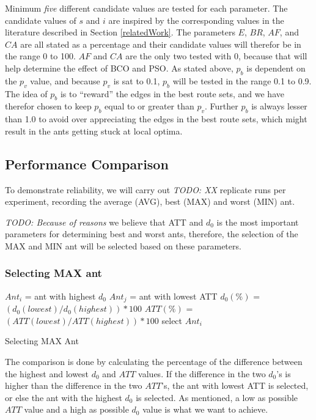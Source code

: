 Minimum \textit{five} different candidate values are tested for each parameter. The candidate values of $s$ and $i$ are inspired by the corresponding values in the literature described in Section \vref{relatedWork}. The parameters $E$, $BR$, $AF$, and $CA$ are all stated as a percentage and their candidate values will therefor be in the range 0 to 100. $AF$ and $CA$ are the only two tested with 0, because that will help determine the effect of BCO and PSO. As stated above, $p_b$ is dependent on the $p_v$ value, and because $p_v$ is sat to 0.1, $p_b$ will be tested in the range 0.1 to 0.9. The idea of $p_b$ is to ``reward'' the edges in the best route sets, and we have therefor chosen to keep $p_b$ equal to or greater than $p_v$. Further $p_b$ is always lesser than 1.0 to avoid over appreciating the edges in the best route sets, which might result in the ants getting stuck at local optima. 

\subsection{Performance Comparison}

To demonstrate reliability, we will carry out \emph{\color{blue} TODO: XX } replicate runs per experiment, recording the average (AVG), best (MAX) and worst (MIN) ant.  

\emph{\color{blue} TODO: Because of reasons }we believe that ATT and $d_0$ is the most important parameters for determining best and worst ants, therefore, the selection of the MAX and MIN ant will be selected based on these parameters. 

\subsubsection{Selecting MAX ant}
\begin{algorithm}[H]
$Ant_{i}$ = ant with highest $d_0$\;
$Ant_{j}$ = ant with lowest ATT\;
{
	$d_0(\%)$ = $(d_0(lowest) / d_0(highest))*100$\;
	$ATT(\%)$ = $(ATT(lowest) / ATT(highest))*100$\;
	{
		select $Ant_{i}$
	}
}
 \caption{Selecting MAX Ant}
\end{algorithm}


The comparison is done by calculating the percentage of the difference between the highest and lowest $d_0$ and $ATT$ values. If the difference in the two $d_0$'s is higher than the difference in the two $ATT$'s, the ant with lowest ATT is selected, or else the ant with the highest $d_0$ is selected. As mentioned, a low as possible $ATT$ value and a high as possible $d_0$ value is what we want to achieve.

